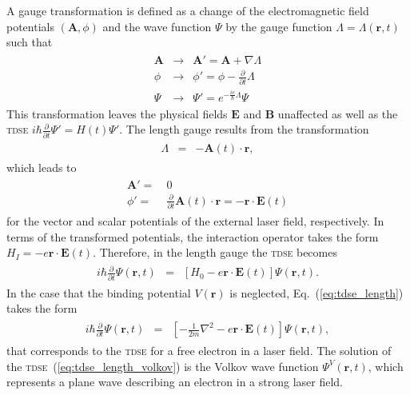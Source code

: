 A gauge transformation is defined as a change of the electromagnetic
field potentials $(\mathbf{A}, \phi)$ and the wave function $\Psi$ by
the gauge function $\Lambda = \Lambda(\mathbf{r},t)$ such that
%
\begin{eqnarray}
  \label{eq:gauge}
  \begin{split}
    \mathbf{A} & \to & \mathbf{A}' = \mathbf{A} + \nabla\Lambda \\
    \phi & \to & \phi' = \phi - \frac{\partial}{\partial t}\Lambda \\
    \Psi & \to & \Psi' = e^{-\frac{ie}{\hbar} \Lambda} \Psi
  \end{split}
\end{eqnarray}
%
This transformation leaves the physical fields $\mathbf{E}$ and
$\mathbf{B}$ unaffected as well as the \textsc{tdse} $i \hbar
\frac{\partial}{\partial t}\Psi' = H(t) \Psi'$. The length gauge
results from the transformation
%
\begin{eqnarray}
  \label{eq:length_gauge}
  \begin{split}
    \Lambda & = & -\mathbf{A}(t) \cdot \mathbf{r},
  \end{split}
\end{eqnarray}
%
which leads to
%
\begin{eqnarray}
  \label{eq:A_length}
  \begin{split}
    \mathbf{A}' = &\ 0 \\
    \phi' = &\ \frac{\partial}{\partial t}
    \mathbf{A}(t) \cdot \mathbf{r} = -\mathbf{r} \cdot \mathbf{E}(t) 
  \end{split}
\end{eqnarray}
for the vector and scalar potentials of the external laser field,
respectively. In terms of the transformed potentials, the interaction
operator takes the form $H_{I} = -e \mathbf{r} \cdot \mathbf{E}(t)$.
Therefore, in the length gauge the \textsc{tdse} becomes
%
\begin{eqnarray}
  \label{eq:tdse_length}
  \begin{split}
    i \hbar \frac{\partial}{\partial t} \Psi(\mathbf{r}, t) & = &
    \left[H_{0} -
      e\mathbf{r}\cdot\mathbf{E}(t) \right] \Psi(\mathbf{r}, t).
  \end{split}
\end{eqnarray}
%
In the case that the binding potential $V(\mathbf{r})$ is neglected,
Eq.~(\ref{eq:tdse_length}) takes the form
%
\begin{eqnarray}
  \label{eq:tdse_length_volkov}
  \begin{split}
    i \hbar \frac{\partial}{\partial t} \Psi(\mathbf{r}, t) & = &
    \left[-\frac{1}{2m} \nabla^{2} -
      e\mathbf{r}\cdot\mathbf{E}(t) \right] \Psi(\mathbf{r}, t),
  \end{split}
\end{eqnarray}
%
that corresponds to the \textsc{tdse} for a free electron in a laser
field. The solution of the \textsc{tdse}~(\ref{eq:tdse_length_volkov})
is the Volkov wave function $\Psi^{V}(\mathbf{r}, t)$, which
represents a plane wave describing an electron in a strong laser
field.

